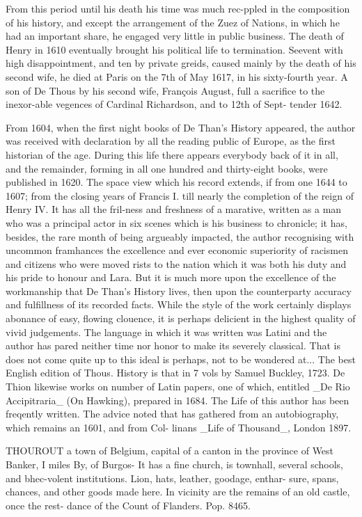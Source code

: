From this period until his death his time was much rec-ppled in the composition of his history, and except the arrangement of the Zuez of Nations, in which he had an important share, he engaged very little in public business. The death of Henry in 1610 eventually brought his political life to termination. Seevent with high disappointment, and ten by private greids, caused mainly by the death of his second wife, he died at Paris on the 7th of May 1617, in his sixty-fourth year. A son of De Thous by his second wife, François August, full a sacrifice to the inexor-able vegences of Cardinal Richardson, and to 12th of Sept- tender 1642.\par\medskip
From 1604, when the first night books of De Than’s History appeared, the author was received with declaration by all the reading public of Europe, as the first historian of the age. During this life there appears everybody back of it in all, and the remainder, forming in all one hundred and thirty-eight books, were published in 1620. The space view which his record extends, if from one 1644 to 1607; from the closing years of Francis I. till nearly the completion of the reign of Henry IV. It has all the fril-ness and freshness of a marative, written as a man who was a principal actor in six scenes which is his business to chronicle; it has, besides, the rare month of being argueably impacted, the author recognising with uncommon framhances the excellence and ever economic superiority of racismen and citizens who were moved rists to the nation which it was both his duty and his pride to honour and Lara. But it is much more upon the excellence of the workmanship that De Than’s History lives, then upon the counterparty accuracy and fulfillness of its recorded facts. While the style of the work certainly displays abonance of easy, flowing clouence, it is perhaps delicient in the highest quality of vivid judgements. The language in which it was written was Latini and the author has pared neither time nor honor to make its severely classical. That is does not come quite up to this ideal is perhaps, not to be wondered at... The best English edition of Thous. History is that in 7 vols by Samuel Buckley, 1723. De Thion likewise works on number of Latin papers, one of which, entitled \_De Rio Accipitraria\_ (On Hawking), prepared in 1684. The Life of this author has been freqently written. The advice noted that has gathered from an autobiography, which remains an 1601, and from Col- linans \_Life of Thousand\_, London 1897.\par\medskip
THOUROUT a town of Belgium, capital of a canton in the province of West Banker, I miles By, of Burgos- It has a fine church, is townhall, several schools, and bhec-volent institutions. Lion, hats, leather, goodage, enthar- sure, spans, chances, and other goods made here. In vicinity are the remains of an old castle, once the rest- dance of the Count of Flanders. Pop. 8465.\par\medskip
